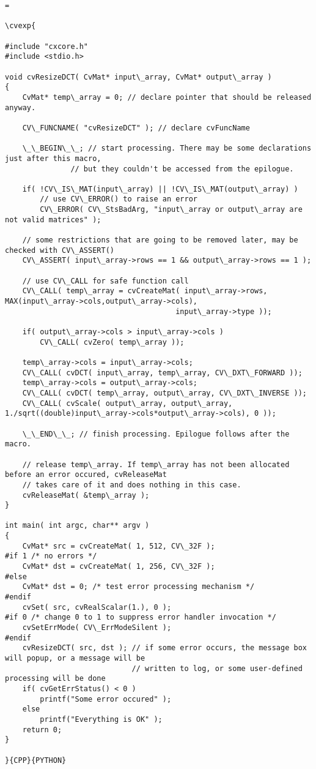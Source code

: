 \label{Use of Error Handling Macros}
\begin{verbatim}=

\cvexp{

#include "cxcore.h"
#include <stdio.h>

void cvResizeDCT( CvMat* input\_array, CvMat* output\_array )
{
    CvMat* temp\_array = 0; // declare pointer that should be released anyway.

    CV\_FUNCNAME( "cvResizeDCT" ); // declare cvFuncName

    \_\_BEGIN\_\_; // start processing. There may be some declarations just after this macro,
               // but they couldn't be accessed from the epilogue.

    if( !CV\_IS\_MAT(input\_array) || !CV\_IS\_MAT(output\_array) )
        // use CV\_ERROR() to raise an error
        CV\_ERROR( CV\_StsBadArg, "input\_array or output\_array are not valid matrices" );

    // some restrictions that are going to be removed later, may be checked with CV\_ASSERT()
    CV\_ASSERT( input\_array->rows == 1 && output\_array->rows == 1 );

    // use CV\_CALL for safe function call
    CV\_CALL( temp\_array = cvCreateMat( input\_array->rows, MAX(input\_array->cols,output\_array->cols),
                                       input\_array->type ));

    if( output\_array->cols > input\_array->cols )
        CV\_CALL( cvZero( temp\_array ));

    temp\_array->cols = input\_array->cols;
    CV\_CALL( cvDCT( input\_array, temp\_array, CV\_DXT\_FORWARD ));
    temp\_array->cols = output\_array->cols;
    CV\_CALL( cvDCT( temp\_array, output\_array, CV\_DXT\_INVERSE ));
    CV\_CALL( cvScale( output\_array, output\_array, 1./sqrt((double)input\_array->cols*output\_array->cols), 0 ));

    \_\_END\_\_; // finish processing. Epilogue follows after the macro.

    // release temp\_array. If temp\_array has not been allocated before an error occured, cvReleaseMat
    // takes care of it and does nothing in this case.
    cvReleaseMat( &temp\_array );
}

int main( int argc, char** argv )
{
    CvMat* src = cvCreateMat( 1, 512, CV\_32F );
#if 1 /* no errors */
    CvMat* dst = cvCreateMat( 1, 256, CV\_32F );
#else
    CvMat* dst = 0; /* test error processing mechanism */
#endif
    cvSet( src, cvRealScalar(1.), 0 );
#if 0 /* change 0 to 1 to suppress error handler invocation */
    cvSetErrMode( CV\_ErrModeSilent );
#endif
    cvResizeDCT( src, dst ); // if some error occurs, the message box will popup, or a message will be
                             // written to log, or some user-defined processing will be done
    if( cvGetErrStatus() < 0 )
        printf("Some error occured" );
    else
        printf("Everything is OK" );
    return 0;
}

}{CPP}{PYTHON}


\end{verbatim}
